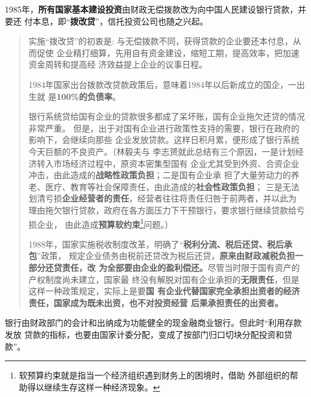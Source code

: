 1985年，\textbf{所有国家基本建设投资}由财政无偿拨款改为向中国人民建设银行贷款，并要还
付本息，即“\textbf{拨改贷}”，信托投资公司也随之兴起。
\begin{quotation}
  实施“拨改贷”的初衷是: 与无偿拨款不同，获得贷款的企业要还本付息，从而促使
  企业精打细算，先用自有资金建设，缩短工期，提高效率，把加速资金周转和提高经
  济效益提上企业的议事日程。

  1984年国家出台拨款改贷款政策后，意味着1984年以后新成立的国企，一出生就
  是\textbf{100\%的负债率}。\cite{bogaidaizhaizhuangu}


  银行系统贷给国有企业的贷款很多都成了呆坏账，国有企业拖欠还贷的情况非常严重。
  但是，出于对国有企业进行政策性支持的需要，银行在政府的影响下，会继续向那些
  企业发放贷款。这样日积月累，便形成了银行系统今天巨额的不良资产。（林毅夫与
  李志赟就此总结有三个原因，一是计划经济转入市场经济过程中，原资本密集型国有
  企业尤其受到外资、合资企业冲击，由此造成的\textbf{战略性政策负担}；二是国有企业承
  担了大量劳动力的养老、医疗、教育等社会保障责任，由此造成的\textbf{社会性政策负担}；
  三是无法划清亏损\textbf{企业经营者的责任}，经营者往往将责任归咎于前两者，并以此为
  理由拖欠银行贷款，政府在各方面压力下干预银行，要求银行继续贷款给亏损企业，
  由此造成\textbf{预算软约束}\footnote{软预算约束就是指当一个经济组织遇到财务上的困境时，借助
    外部组织的帮助得以继续生存这样一种经济现象。}问题。）\cite{guoyoujinrong}

  1988年，国家实施税收制度改革，明确了“\textbf{税利分流、税后还贷、税后承包}”政策，
  规定企业债务由税前还贷改为税后还贷，\textbf{原来由财政减税负担一部分还贷责任，改
    为全部要由企业的盈利偿还。}尽管当时限于国有资产的产权制度尚未建立，国家最
  终没有解脱对国有企业承担的\textbf{无限责任}，但是这样一种政策规定，实际上是要\textbf{国
    有企业代替国家完全承担出资者的经济责任，国家成为既未出资，也不对投资经营
    后果承担责任的出资者。}\cite{bogaidai30}
\end{quotation}

银行由财政部门的会计和出纳成为功能健全的现金融商业银行。但此时“利用存款发放
贷款的指标，也要由国家计委分配，变成了按部门归口切块分配投资和贷款”。



